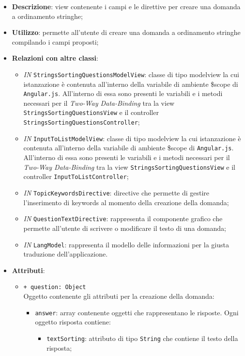 \begin{itemize}
	\item \textbf{Descrizione}: view contenente i campi e le direttive per creare una domanda a ordinamento stringhe;
	\item \textbf{Utilizzo}: permette all'utente di creare una domanda a ordinamento stringhe compilando i campi proposti;
	\item \textbf{Relazioni con altre classi}:
		\begin{itemize}
			\item \textit{IN} \texttt{StringsSortingQuestionsModelView}: classe di tipo modelview la cui istanzazione è contenuta all'interno della variabile di ambiente \$scope di \texttt{Angular.js}. All'interno di essa sono presenti le variabili e i metodi necessari per il \textit{Two-Way Data-Binding} tra la view \texttt{StringsSortingQuestionsView} e il controller \texttt{StringsSortingQuestionsController};
			\item \textit{IN} \texttt{InputToListModelView}: classe di tipo modelview la cui istanzazione è contenuta all'interno della variabile di ambiente \$scope di \texttt{Angular.js}. All'interno di essa sono presenti le variabili e i metodi necessari per il \textit{Two-Way Data-Binding} tra la view \texttt{StringsSortingQuestionsView} e il controller \texttt{InputToListController};
			\item \textit{IN} \texttt{TopicKeywordsDirective}: directive che permette di gestire l'inserimento di keywords al momento della creazione della domanda;
			\item \textit{IN} \texttt{QuestionTextDirective}: rappresenta il componente grafico che permette all'utente di scrivere o modificare il testo di una domanda;
			\item \textit{IN} \texttt{LangModel}: rappresenta il modello delle informazioni per la giusta traduzione dell'applicazione.
		\end{itemize}
	\item \textbf{Attributi}:
	\begin{itemize}
		\item \texttt{+ question: Object} \\ Oggetto contenente gli attributi per la creazione della domanda:
		\begin{itemize}
			\item \texttt{answer}: array contenente oggetti che rappresentano le risposte. Ogni oggetto risposta contiene:
			\begin{itemize}
				\item \texttt{textSorting}: attributo di tipo \texttt{String} che contiene il testo della risposta;

\end{itemize}
\end{itemize}
\end{itemize}
\end{itemize}
